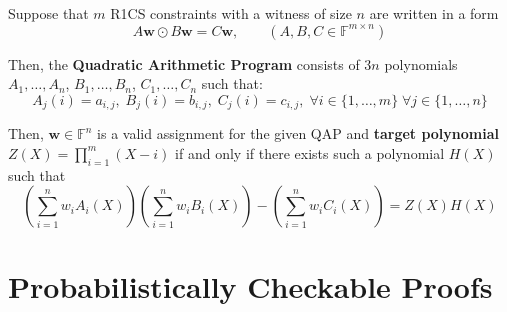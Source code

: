 \documentclass{zkdl-presentation-template}
\begin{document}
    \begin{frame}
        \begin{definition}
            Suppose that $m$ R1CS constraints with a witness of size $n$ are written in a form
            \begin{equation*}
                A\mathbf{w} \odot B\mathbf{w} = C\mathbf{w}, \qquad (A,B,C \in \mathbb{F}^{m \times n})
            \end{equation*}
        
            Then, the \textbf{Quadratic Arithmetic Program} consists of $3n$ polynomials $A_1,\dots,A_n$, $B_1,\dots,B_n$, $C_1,\dots,C_n$ such that:
            \begin{equation*}
                A_j(i) = a_{i,j}, \; B_j(i) = b_{i,j}, \; C_j(i) = c_{i,j}, \; \forall i \in \{1,\dots,m\} \; \forall j \in \{1,\dots,n\}
            \end{equation*}
        
            Then, $\mathbf{w} \in \mathbb{F}^n$ is a valid assignment for the given QAP and \textbf{target polynomial} $Z(X) = \prod_{i=1}^m (X-i)$ if and only if there exists such a polynomial $H(X)$ such that
            \begin{equation*}
                \left( \sum_{i = 1}^{n} w_iA_i(X) \right)\left( \sum_{i = 1}^{n} w_iB_i(X) \right) - \left( \sum_{i = 1}^{n} w_iC_i(X) \right) = Z(X)H(X)
            \end{equation*}
        \end{definition}
    \end{frame}

    \section{Probabilistically Checkable Proofs}
\end{document}
